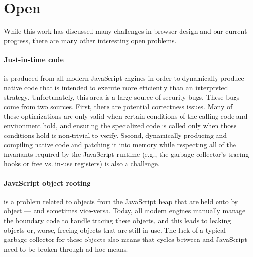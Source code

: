
\section{Open}
\label{sec:open}
While this work has discussed many challenges in browser design and our current progress,
there are many other interesting open problems.

\paragraph{Just-in-time code} is produced from all modern JavaScript engines in order to
dynamically produce native code that is intended to execute more efficiently than an
interpreted strategy.
Unfortunately, this area is a large source of security bugs.
These bugs come from two sources.
First, there are potential correctness issues.
Many of these optimizations are only valid when certain conditions of the calling
code and environment hold, and ensuring the specialized code is called only when those
conditions hold is non-trivial to verify.
Second, dynamically producing and compiling native code and patching it into memory
while respecting all of the invariants required by the JavaScript runtime (e.g., the
garbage collector's tracing hooks or free vs. in-use registers) is also a challenge.

\paragraph{JavaScript object rooting} is a problem related to objects from the JavaScript
heap that are held onto by \Cplusplus object --- and sometimes vice-versa.
Today, all modern engines manually manage the boundary code to handle tracing
these objects, and this leads to leaking objects or, worse, freeing objects that
are still in use.
The lack of a typical garbage collector for these objects also means that cycles
between \Cplusplus and JavaScript need to be broken through ad-hoc means.

